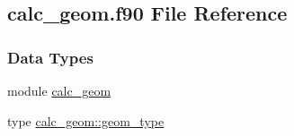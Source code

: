 \hypertarget{calc__geom_8f90}{\subsection{calc\-\_\-geom.\-f90 File Reference}
\label{calc__geom_8f90}
}
\subsubsection*{Data Types}
\begin{DoxyCompactItemize}
\item 
module \hyperlink{classcalc__geom}{calc\-\_\-geom}
\item 
type \hyperlink{structcalc__geom_1_1geom__type}{calc\-\_\-geom\-::geom\-\_\-type}
\end{DoxyCompactItemize}
